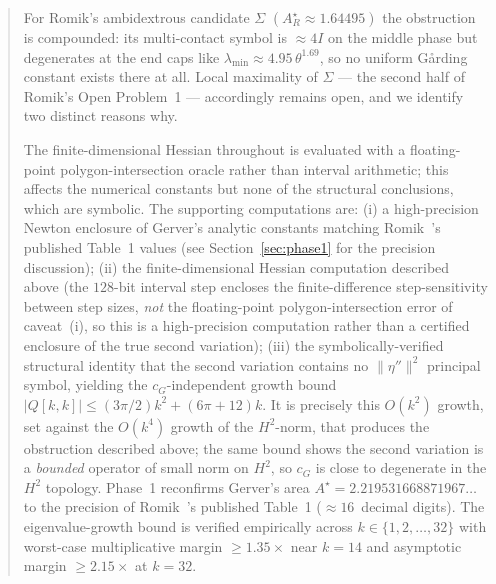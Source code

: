 \documentclass[11pt]{amsart}
\theoremstyle{plain}
\theoremstyle{definition}
\newcommand{\cG}{c_{G}}
\newcommand{\Astar}{A^{\star}}
\begin{document}
\begin{abstract}
For Romik's ambidextrous candidate $\Sigma$
$(A_{R}^{\star}\approx1.64495)$ the obstruction is compounded: its
multi-contact symbol is $\approx4I$ on the middle phase but
degenerates at the end caps like $\lambda_{\min}\approx4.95\,
\theta^{1.69}$, so no uniform G\aa rding constant exists there at all.
Local maximality of $\Sigma$ --- the second half of Romik's Open
Problem~1 --- accordingly remains open, and we identify two distinct
reasons why.

The finite-dimensional Hessian throughout is evaluated with a
floating-point polygon-intersection oracle rather than interval
arithmetic; this affects the numerical constants but none of the
structural conclusions, which are symbolic.
The supporting computations are:
(i) a high-precision Newton enclosure of Gerver's analytic constants
matching Romik~\cite{Romik2018}'s published Table~1 values
(see Section~\ref{sec:phase1} for the precision discussion);
(ii) the finite-dimensional Hessian computation described above (the
$128$-bit interval step encloses the finite-difference
step-sensitivity between step sizes, \emph{not} the floating-point
polygon-intersection error of caveat~(i), so this is a high-precision
computation rather than a certified enclosure of the true second
variation);
(iii) the symbolically-verified structural identity that the second
variation contains no $\|\eta''\|^{2}$ principal symbol, yielding the
$c_{G}$-independent growth bound
$|Q[k,k]| \leq (3\pi/2) k^{2} + (6\pi + 12) k$.  It is precisely this
$O(k^{2})$ growth, set against the $O(k^{4})$ growth of the
$H^{2}$-norm, that produces the obstruction described above; the same
bound shows the second variation is a \emph{bounded} operator of small
norm on $H^{2}$, so $\cG$ is close to degenerate in the
$H^{2}$ topology.
Phase~1 reconfirms Gerver's area
$\Astar = 2.219531668871967\ldots$ to the precision of
Romik~\cite{Romik2018}'s published Table~1
($\approx 16$~decimal digits).
The eigenvalue-growth bound is verified empirically across
$k \in \{1, 2, \ldots, 32\}$ with worst-case multiplicative margin
$\geq 1.35\times$ near $k = 14$ and asymptotic margin
$\geq 2.15\times$ at $k = 32$.
\end{abstract}

\maketitle

\begin{center}\end{center}
\end{document}

